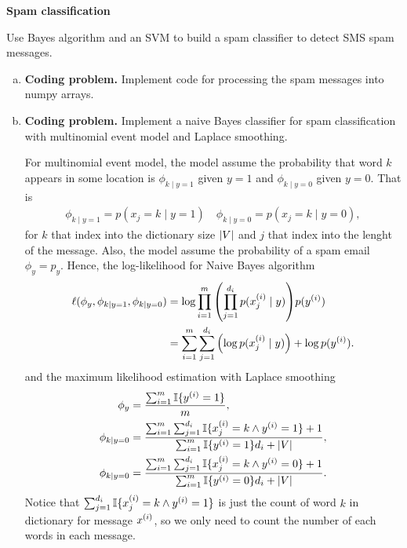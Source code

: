 \documentclass[12pt,letterpaper,boxed]{hmcpset}
\newcommand{\ind}[1]{\mathbb{I}\{#1\}}
\begin{document}
\begin{problem}[Problem 6]
  \textbf{Spam classification}

  Use Bayes algorithm and an SVM to build a spam classifier to detect SMS spam messages. 
\end{problem}

\begin{solution}
  \begin{enumerate}[(a)]
    \item \textbf{Coding problem.} Implement code for processing the spam messages into numpy arrays.
    
    \item \textbf{Coding problem.} Implement a naive Bayes classifier for spam classification with multinomial event model and Laplace smoothing.
    
    For multinomial event model, the model assume the probability that word $k$ appears in some location is $\phi_{k \mid y = 1}$ given $y = 1$ and $\phi_{k \mid y = 0}$ given $y = 0$. That is 
    \[
    \begin{aligned}
      \phi_{k \mid y = 1} = p(x_j = k \mid y = 1) \quad \phi_{k \mid y = 0} = p(x_j = k \mid y = 0),
    \end{aligned}
    \]
    for $k$ that index into the dictionary size $\left\lvert V\right\rvert$ and $j$ that index into the lenght of the message. Also, the model assume the probability of a spam email $\phi_y = p_y$. Hence, the log-likelihood for Naive Bayes algorithm
    \[
    \begin{aligned}
      \ell(\phi_y, \phi_{k \mid y = 1}, \phi_{k \mid y = 0}) &= \log \prod_{i=1}^m \qty(\prod_{j=1}^{d_i} p(x_j^{(i)} \mid y)) p(\yy) \\
      &= \sum_{i=1}^m \sum_{j=1}^{d_i} \qty (\log p(x_j^{(i)} \mid y)) + \log p(\yy).
    \end{aligned}
    \]
    and the maximum likelihood estimation with Laplace smoothing
    \[
    \begin{aligned}
      \phi_y &= \frac{\sum_{i=1}^m \ind{\yy = 1} }{m}, \\
      \phi_{k \mid y = 0} &= \frac{\sum_{i=1}^m \sum_{j=1}^{d_i} \ind{x_j^{(i)} = k \land \yy = 1} + 1}{\sum_{i=1}^m \ind {\yy = 1} d_i + \abs{V}}, \\
      \phi_{k \mid y = 0} &= \frac{\sum_{i=1}^m \sum_{j=1}^{d_i} \ind{x_j^{(i)} = k \land \yy = 0} + 1}{\sum_{i=1}^m \ind {\yy = 0} d_i + \abs{V}}. \\
    \end{aligned}
    \]
    Notice that $\sum_{j=1}^{d_i} \ind{x_j^{(i)} = k \land \yy = 1}$ is just the count of word $k$ in dictionary for message $\xx$, so we only need to count the number of each words in each message.


\end{enumerate}
\end{solution}
\end{document}
